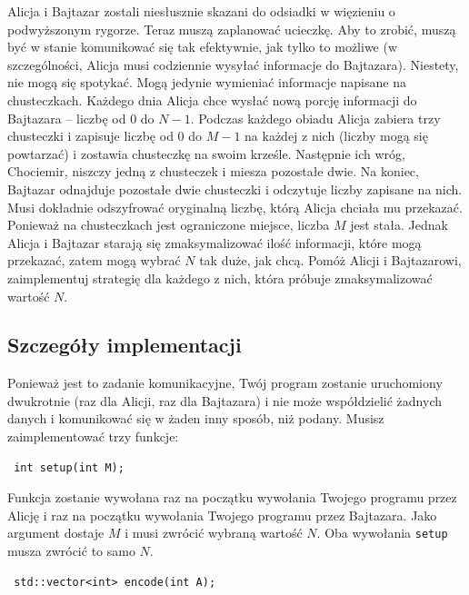 \documentclass[12pt]{article}
\begin{document}
\renewcommand{\round}{Dzień 1}
\renewcommand{\problemName}{Więzienie}
\renewcommand{\lang}{Polski}

\renewcommand{\tl}{$2$ sek.}
\renewcommand{\ml}{$1024$ MB}
\problem{\problemName}

Alicja i Bajtazar zostali niesłusznie skazani do odsiadki w więzieniu o podwyższonym rygorze. Teraz muszą zaplanować ucieczkę. Aby to zrobić, muszą być w stanie komunikować się tak efektywnie, jak tylko to możliwe (w szczególności, Alicja musi codziennie wysyłać informacje do Bajtazara). Niestety, nie mogą się spotykać. Mogą jedynie wymieniać informacje napisane na chusteczkach. Każdego dnia Alicja chce wysłać nową porcję informacji do Bajtazara -- liczbę od $0$ do $N-1$. Podczas każdego obiadu Alicja zabiera trzy chusteczki i zapisuje liczbę od $0$ do $M-1$ na każdej z nich (liczby mogą się powtarzać) i zostawia chusteczkę na swoim krześle. Następnie ich wróg, Chociemir, niszczy jedną z chusteczek i miesza pozostałe dwie. Na koniec, Bajtazar odnajduje pozostałe dwie chusteczki i odczytuje liczby zapisane na nich. Musi dokładnie odszyfrować oryginalną liczbę, którą Alicja chciała mu przekazać. Ponieważ na chusteczkach jest ograniczone miejsce, liczba $M$ jest stała. Jednak Alicja i Bajtazar starają się zmaksymalizować ilość informacji, które mogą przekazać, zatem mogą wybrać $N$ tak duże, jak chcą. Pomóż Alicji i Bajtazarowi, zaimplementuj strategię dla każdego z nich, która próbuje zmaksymalizować wartość $N$.

\subsection{Szczegóły implementacji}
Ponieważ jest to zadanie komunikacyjne, Twój program zostanie uruchomiony dwukrotnie (raz dla Alicji, raz dla Bajtazara) i nie może współdzielić żadnych danych i komunikować się w żaden inny sposób, niż podany.
Musisz zaimplementować trzy funkcje:

\begin{lstlisting}
 int setup(int M);
\end{lstlisting}

Funkcja zostanie wywołana raz na początku wywołania Twojego programu przez Alicję i raz na początku wywołania Twojego programu przez Bajtazara. Jako argument dostaje $M$ i musi zwrócić wybraną wartość $N$. Oba wywołania \texttt{setup} musza zwrócić to samo $N$.

\begin{lstlisting}
 std::vector<int> encode(int A);
\end{lstlisting}
\end{document}

